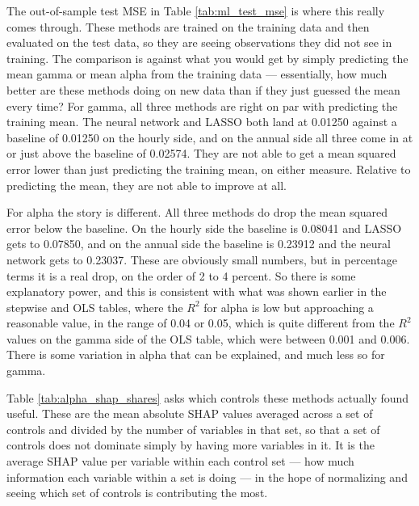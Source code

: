 \documentclass[12pt]{article}
\begin{document}
\begin{onehalfspace}
The out-of-sample test MSE in Table \ref{tab:ml_test_mse} is where this really comes through. These methods are trained on the training data and then evaluated on the test data, so they are seeing observations they did not see in training. The comparison is against what you would get by simply predicting the mean gamma or mean alpha from the training data --- essentially, how much better are these methods doing on new data than if they just guessed the mean every time? For gamma, all three methods are right on par with predicting the training mean. The neural network and LASSO both land at 0.01250 against a baseline of 0.01250 on the hourly side, and on the annual side all three come in at or just above the baseline of 0.02574. They are not able to get a mean squared error lower than just predicting the training mean, on either measure. Relative to predicting the mean, they are not able to improve at all.



For alpha the story is different. All three methods do drop the mean squared error below the baseline. On the hourly side the baseline is 0.08041 and LASSO gets to 0.07850, and on the annual side the baseline is 0.23912 and the neural network gets to 0.23037. These are obviously small numbers, but in percentage terms it is a real drop, on the order of 2 to 4 percent. So there is some explanatory power, and this is consistent with what was shown earlier in the stepwise and OLS tables, where the $R^2$ for alpha is low but approaching a reasonable value, in the range of 0.04 or 0.05, which is quite different from the $R^2$ values on the gamma side of the OLS table, which were between 0.001 and 0.006. There is some variation in alpha that can be explained, and much less so for gamma.

Table \ref{tab:alpha_shap_shares} asks which controls these methods actually found useful. These are the mean absolute SHAP values averaged across a set of controls and divided by the number of variables in that set, so that a set of controls does not dominate simply by having more variables in it. It is the average SHAP value per variable within each control set --- how much information each variable within a set is doing --- in the hope of normalizing and seeing which set of controls is contributing the most.

\begin{table}[H]
    \centering
    \caption{Group SHAP Shares of Controls, Alpha (Average |SHAP| per Variable x 100)}
    \label{tab:alpha_shap_shares}
    
\end{table}



\end{onehalfspace}
\end{document}
